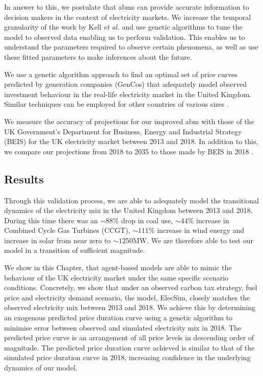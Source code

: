 In answer to this, we postulate that \acrshort{abm}s can provide accurate information to decision makers in the context of electricity markets. We increase the temporal granularity of the work by Kell \textit{et al.} \cite{Kell} and use genetic algorithms to tune the model to observed data enabling us to perform validation. This enables us to understand the parameters required to observe certain phenomena, as well as use these fitted parameters to make inferences about the future. 




We use a genetic algorithm approach to find an optimal set of price curves predicted by generation companies (GenCos) that adequately model observed investment behaviour in the real-life electricity market in the United Kingdom. Similar techniques can be employed for other countries of various sizes \cite{Kell}. 

We measure the accuracy of projections for our improved \acrshort{abm} with those of the UK Government's Department for Business, Energy and Industrial Strategy (BEIS) for the UK electricity market between 2013 and 2018. In addition to this, we compare our projections from 2018 to 2035 to those made by BEIS in 2018 \cite{DBEIS2019}.




\subsection{Results}

Through this validation process, we are able to adequately model the transitional dynamics of the electricity mix in the United Kingdom between 2013 and 2018. During this time there was an ${\sim}88\%$ drop in coal use, ${\sim}44\%$ increase in Combined Cycle Gas Turbines (CCGT), ${\sim}111\% $ increase in wind energy and increase in solar from near zero to ${\sim}1250$MW. We are therefore able to test our model in a transition of sufficient magnitude.


We show in this Chapter, that agent-based models are able to mimic the behaviour of the UK electricity market under the same specific scenario conditions. Concretely, we show that under an observed carbon tax strategy, fuel price and electricity demand scenario, the model, ElecSim, closely matches the observed electricity mix between 2013 and 2018. We achieve this by determining an exogenous predicted price duration curve using a genetic algorithm to minimise error between observed and simulated electricity mix in 2018. The predicted price curve is an arrangement of all price levels in descending order of magnitude. The predicted price duration curve achieved is similar to that of the simulated price duration curve in 2018, increasing confidence in the underlying dynamics of our model. 

